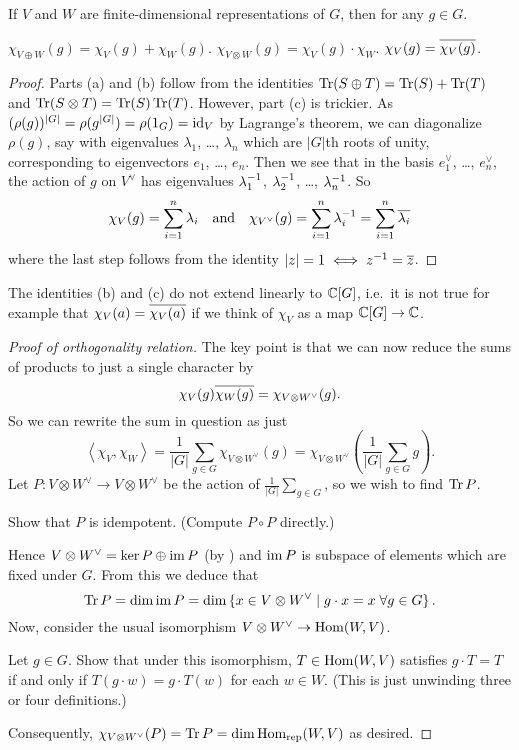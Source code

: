 \begin{theorem}
	If $V$ and $W$ are finite-dimensional representations of $G$,
	then for any $g \in G$.
	\begin{enumerate}[(a)]
		\ii $\chi_{V \oplus W}(g) = \chi_V(g) + \chi_W(g)$.
		\ii $\chi_{V \otimes W}(g) = \chi_V(g) \cdot \chi_W$.
		\ii $\chi_{V}(g) = \overline{\chi_V(g)}$.
	\end{enumerate}
\end{theorem}
\begin{proof}
	Parts (a) and (b) follow from the identities
	$\operatorname{Tr}(S \oplus T) = \operatorname{Tr}(S) + \operatorname{Tr}(T)$
	and $\operatorname{Tr}(S \otimes T) = \operatorname{Tr}(S) \operatorname{Tr}(T)$.
	However, part (c) is trickier.
	As $(\rho(g))^{|G|} = \rho(g^{|G|}) = \rho(1_G) = \mathrm{id}_V$
	by Lagrange's theorem, we can diagonalize $\rho(g)$,
	say with eigenvalues $\lambda_1$, \dots, $\lambda_n$
	which are $|G|$th roots of unity,
	corresponding to eigenvectors $e_1$, \dots, $e_n$.
	Then we see that in the basis $e_1^\vee$, \dots, $e_n^\vee$,
	the action of $g$ on $V^\vee$ has eigenvalues
	$\lambda_1^{-1}$, $\lambda_2^{-1}$, \dots, $\lambda_n^{-1}$.
	So
	\[
		\chi_V(g) = \sum_{i=1}^n \lambda_i \quad\text{and}\quad
		\chi_{V^\vee}(g) = \sum_{i=1}^n \lambda_i^{-1} = \sum_{i=1}^n \overline{\lambda_i}
	\]
	where the last step follows from the identity $|z|=1 \iff z^{-1} = \overline z$.
\end{proof}
\begin{remark}
	[Warning]
	The identities (b) and (c) do not extend linearly to $\mathbb C[G]$,
	i.e.\ it is not true for example that $\chi_V(a) = \overline{\chi_V(a)}$
	if we think of $\chi_V$ as a map $\mathbb C[G] \to \mathbb C$.
\end{remark}
\begin{proof}
	[Proof of orthogonality relation]
	The key point is that we can now reduce
	the sums of products to just a single character by
	\[ \chi_V(g) \overline{\chi_W(g)} = \chi_{V \otimes W^\vee} (g). \]
	So we can rewrite the sum in question as just
	\[
		\left< \chi_V, \chi_W \right>
		= \frac{1}{|G|} \sum_{g \in G} \chi_{V \otimes W^\vee} (g)
		= \chi_{V \otimes W^\vee}
		\left( \frac{1}{|G|} \sum_{g \in G} g \right).
	\]
	Let $P : V \otimes W^\vee \to V \otimes W^\vee$ be the
	action of $\frac{1}{|G|} \sum_{g \in G}$,
	so we wish to find $\operatorname{Tr} P$.
	\begin{exercise}
		Show that $P$ is idempotent.
		(Compute $P \circ P$ directly.)
	\end{exercise}
	Hence $V \otimes W^\vee = \ker P \oplus \operatorname{im} P$ (by )
	and $\operatorname{im} P$ is subspace of elements which are fixed under $G$.
	From this we deduce that
	\[ \operatorname{Tr} P = \dim \operatorname{im} P =
		\dim \left\{ x \in V \otimes W^\vee
		\mid g \cdot x = x \; \forall g \in G  \right\}.
		\]
	Now, consider the usual isomorphism $V \otimes W^\vee \to \operatorname{Hom}(W, V)$.
	\begin{exercise}
		Let $g \in G$.
		Show that under this isomorphism, $T \in \operatorname{Hom}(W, V)$
		satisfies $g \cdot T = T$ if and only if
		$T(g \cdot w) = g \cdot T(w)$ for each $w \in W$.
		(This is just unwinding three or four definitions.)
	\end{exercise}
	Consequently, $\chi_{V \otimes W^\vee}(P) = \operatorname{Tr} P = \dim \operatorname{Hom}_{\mathrm{rep}}(W,V)$
	as desired.
\end{proof}

